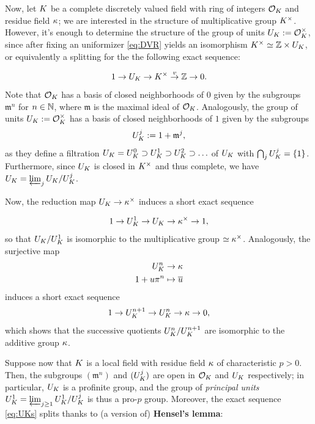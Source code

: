 \documentclass[a4paper, oneside]{memoir}
\begin{document}
Now, let $K$ be a complete discretely valued field with ring of integers $\mathcal{O}_K$ and residue field $\kappa$; we are interested in the structure of multiplicative group $K^\times$. However, it's enough to determine the structure of the group of units $U_K:=\mathcal{O}_K^\times$, since after fixing an uniformizer \eqref{eq:DVR} yields an isomorphism $K^\times\simeq \mathbb{Z}\times U_K$, or equivalently a splitting for the the following exact sequence:

\begin{equation}\label{eq:SplitSeq}
	1\to U_K \to K^\times\overset{v}{\to}\mathbb{Z}\to 0.
\end{equation}
Note that $\mathcal{O}_K$ has a basis of closed neighborhoods of $0$ given by the subgroups $\mathfrak{m}^n$ for $n\in\mathbb{N}$, where $\mathfrak{m}$ is the maximal ideal of $\mathcal{O}_K$. Analogously, the group of units $U_K:=\mathcal{O}_K^\times$ has a basis of closed neighborhoods of $1$ given by the subgroups
\[
	U_K^j:=1+\mathfrak{m}^j,
\]
as they define a filtration $U_K = U_K^0\supset U_K^1\supset U_K^2\supset\ldots$ of $U_K$ with $\bigcap_j{U_K^j}=\{1\}$. Furthermore, since $U_K$ is closed in $K^\times$ and thus complete, we have $U_K=\varprojlim_j{U_K / U_K^j}$.

Now, the reduction map $U_K\to \kappa^\times$ induces a short exact sequence

\begin{equation}\label{eq:UKs}
	1\to U_K^1\to U_K\to \kappa^\times \to 1,
\end{equation}
so that $U_K/U_K^1$ is isomorphic to the multiplicative group $\simeq \kappa^\times$. Analogously, the surjective map
\begin{align*}
	U_K^n       & \to \kappa               \\
	1 + u \pi ^n & \mapsto \overline{u}
\end{align*}
induces a short exact sequence
\[
	1\to U_K^{n+1} \to U_K^n\to \kappa\to 0,
\]
which shows that the successive quotients $U_K^n/U_K^{n+1}$ are isomorphic to the additive group $\kappa$.

Suppose now that $K$ is a local field with residue field $\kappa$ of characteristic $p>0$. Then, the subgroups $(\mathfrak{m}^n)$ and $(U_K^j)$ are open in $\mathcal{O}_K$ and $U_K$ respectively; in particular, $U_K$ is a profinite group, and the group of \textit{principal units} $U_K^1=\varprojlim_{j\geq 1}{U_K^1 / U_K^j}$ is thus a pro-$p$ group. Moreover, the exact sequence \ref{eq:UKs} splits thanks to (a version of) \textbf{Hensel's lemma}:
\end{document}
